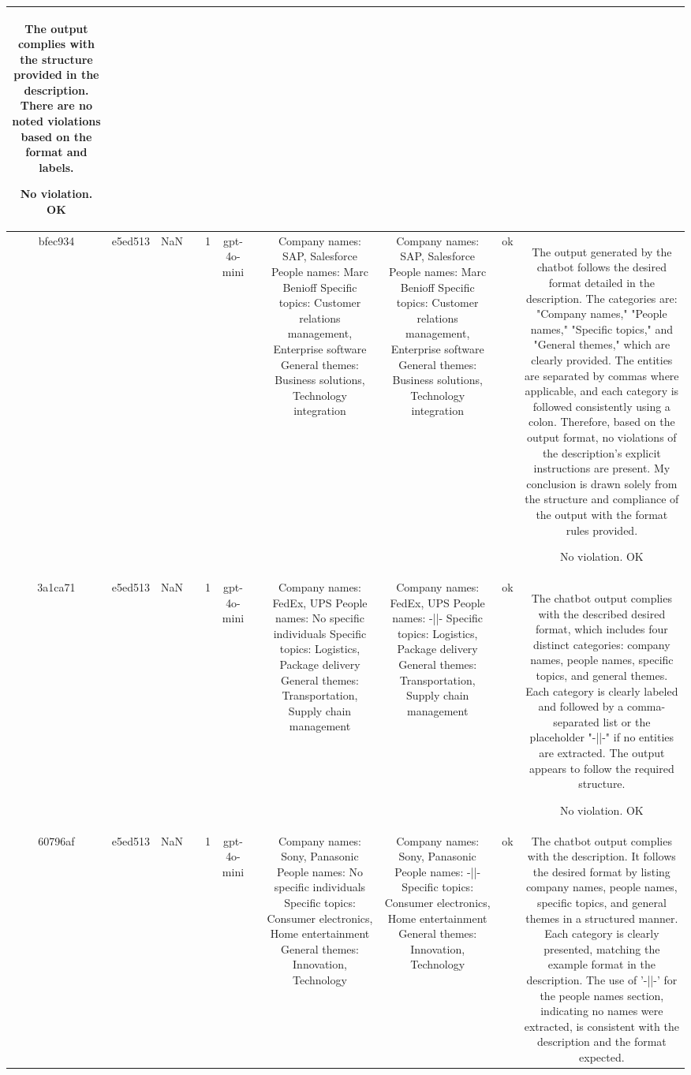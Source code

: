 \begin{table}[h!]
\begin{tabular}{|c|c|c|c|c|c|c|c|c|c|c|}
The output complies with the structure provided in the description. There are no noted violations based on the format and labels.

No violation.
OK\\
\hline
bfec934 & e5ed513 & NaN &  & 1 & gpt-4o-mini &  & Company names: SAP, Salesforce
People names: Marc Benioff
Specific topics: Customer relations management, Enterprise software
General themes: Business solutions, Technology integration & Company names: SAP, Salesforce  
People names: Marc Benioff  
Specific topics: Customer relations management, Enterprise software  
General themes: Business solutions, Technology integration   & ok & The output generated by the chatbot follows the desired format detailed in the description. The categories are: "Company names," "People names," "Specific topics," and "General themes," which are clearly provided. The entities are separated by commas where applicable, and each category is followed consistently using a colon. Therefore, based on the output format, no violations of the description's explicit instructions are present. My conclusion is drawn solely from the structure and compliance of the output with the format rules provided.

No violation.
OK\\
\hline
3a1ca71 & e5ed513 & NaN &  & 1 & gpt-4o-mini &  & Company names: FedEx, UPS
People names: No specific individuals
Specific topics: Logistics, Package delivery
General themes: Transportation, Supply chain management & Company names: FedEx, UPS  
People names: -||-  
Specific topics: Logistics, Package delivery  
General themes: Transportation, Supply chain management   & ok & The chatbot output complies with the described desired format, which includes four distinct categories: company names, people names, specific topics, and general themes. Each category is clearly labeled and followed by a comma-separated list or the placeholder "-||-" if no entities are extracted. The output appears to follow the required structure.

No violation.
OK\\
\hline
60796af & e5ed513 & NaN &  & 1 & gpt-4o-mini &  & Company names: Sony, Panasonic
People names: No specific individuals
Specific topics: Consumer electronics, Home entertainment
General themes: Innovation, Technology & Company names: Sony, Panasonic  
People names: -||-  
Specific topics: Consumer electronics, Home entertainment  
General themes: Innovation, Technology & ok & The chatbot output complies with the description. It follows the desired format by listing company names, people names, specific topics, and general themes in a structured manner. Each category is clearly presented, matching the example format in the description. The use of '-||-' for the people names section, indicating no names were extracted, is consistent with the description and the format expected.


\end{tabular}
\end{table}
